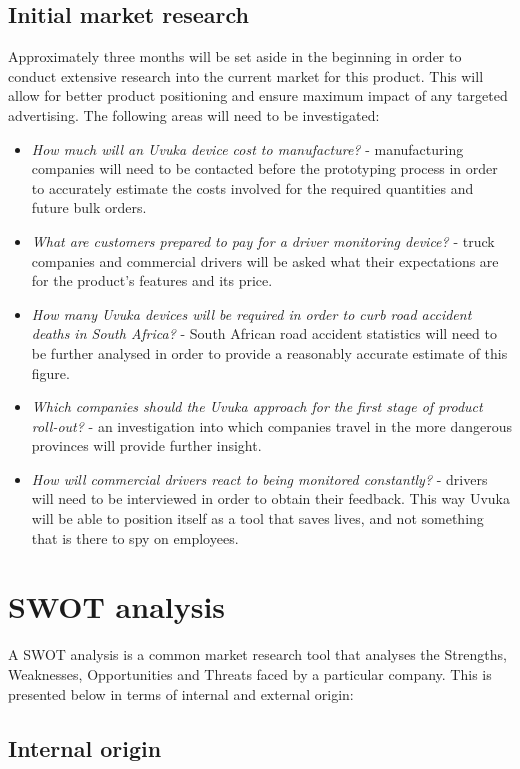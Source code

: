 \subsection{Initial market research}
Approximately three months will be set aside in the beginning in order to conduct extensive research into the current market for this product. This will allow for better product positioning and ensure maximum impact of any targeted advertising. The following areas will need to be investigated:
\begin{itemize}
	\item \textit{How much will an Uvuka device cost to manufacture?} - manufacturing companies will need to be contacted before the prototyping process in order to accurately estimate the costs involved for the required quantities and future bulk orders.
	\item \textit{What are customers prepared to pay for a driver monitoring device?} - truck companies and commercial drivers will be asked what their expectations are for the product's features and its price.
	\item \textit{How many Uvuka devices will be required in order to curb road accident deaths in South Africa?} - South African road accident statistics will need to be further analysed in order to provide a reasonably accurate estimate of this figure.
	\item \textit{Which companies should the Uvuka approach for the first stage of product roll-out?} - an investigation into which companies travel in the more dangerous provinces will provide further insight.
	\item \textit{How will commercial drivers react to being monitored constantly?} - drivers will need to be interviewed in order to obtain their feedback. This way Uvuka will be able to position itself as a tool that saves lives, and not something that is there to spy on employees.
\end{itemize}

 \section{SWOT analysis}
A SWOT analysis is a common market research tool that analyses the Strengths, Weaknesses, Opportunities and Threats faced by a particular company. This is presented below in terms of internal and external origin:
\pagebreak
\subsection{Internal origin}
